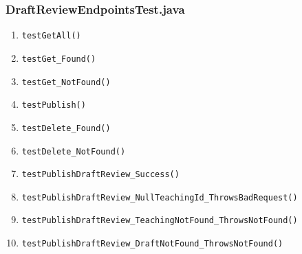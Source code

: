 \subsubsection{DraftReviewEndpointsTest.java}
\begin{enumerate}
	\renewcommand{\theenumi}{\arabic{enumi}}
	\renewcommand{\labelenumi}{\theenumi}
	\item \texttt{testGetAll()} \label{test:testGetAll:Draft}
	\item \texttt{testGet\_Found()} \label{test:testGet_Found:Draft}
	\item \texttt{testGet\_NotFound()} \label{test:testGet_NotFound:Draft}
	\item \texttt{testPublish()} \label{test:testPublish:Draft}
	\item \texttt{testDelete\_Found()} \label{test:testDelete_Found:Draft}
	\item \texttt{testDelete\_NotFound()} \label{test:testDelete_NotFound:Draft}
	\item \texttt{testPublishDraftReview\_Success()} \label{test:testPublishDraftReview_Success:Draft}
	\item \texttt{testPublishDraftReview\_NullTeachingId\_ThrowsBadRequest()} \label{test:testPublishDraftReview_NullTeachingId:Draft}
	\item \texttt{testPublishDraftReview\_TeachingNotFound\_ThrowsNotFound()} \label{test:testPublishDraft_TeachingNF:Draft}
	\item \texttt{testPublishDraftReview\_DraftNotFound\_ThrowsNotFound()} \label{test:testPublishDraft_DraftNF:Draft}
\end{enumerate}
\pagebreak